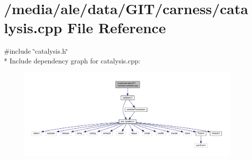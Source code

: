 \hypertarget{a00025}{\section{/media/ale/data/\-G\-I\-T/carness/catalysis.cpp File Reference}
\label{a00025}
}
{\ttfamily \#include \char`\"{}catalysis.\-h\char`\"{}}\\*
Include dependency graph for catalysis.\-cpp\-:\nopagebreak
\begin{figure}[H]
\begin{center}
\leavevmode
\includegraphics[width=350pt]{a00052}
\end{center}
\end{figure}
